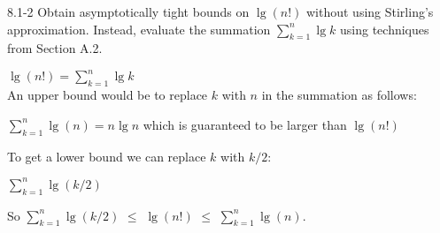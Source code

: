 \begin{problem}{8.1-2}
  Obtain asymptotically tight bounds on $\lg(n!)$ without using Stirling’s approximation. Instead, evaluate the
  summation $\sum\limits_{k=1}^n \lg{k}$ using techniques from Section A.2.
  \begin{solution}
    $\lg(n!) = \sum\limits_{k=1}^n \lg{k}$ \\
    An upper bound would be to replace $k$ with $n$ in the summation as follows:
    \vspace{12pt}

    $\sum\limits_{k=1}^n \lg(n) = n \lg n$ which is guaranteed to be larger than $\lg(n!)$
    \vspace{12pt}

    \noindent To get a lower bound we can replace $k$ with $k/2$:
    \vspace{12pt}

    $\sum\limits_{k=1}^n \lg(k/2)$ \\
    \vspace{12pt}

    \noindent So $\sum\limits_{k=1}^n \lg(k/2)$ $\le$ $\lg(n!)$ $\le$ $\sum\limits_{k=1}^n \lg(n)$.
  \end{solution}
\end{problem} \newpage

